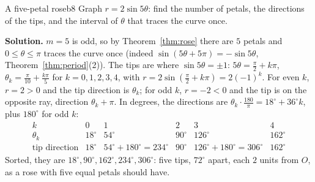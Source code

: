 \documentclass[11pt]{article}
\begin{document}
\begin{center}
\end{center}

\begin{exmp}{A five-petal rose}{b8}
Graph $r=2\sin5\theta$: find the number of petals, the directions of the tips, and the interval of $\theta$ that traces the curve once.

\textbf{Solution.} $m=5$ is odd, so by Theorem~\ref{thm:rose} there are $5$ petals and $0\le\theta\le\pi$ traces the curve once (indeed $\sin(5\theta+5\pi)=-\sin5\theta$, Theorem~\ref{thm:period}(2)). The tips are where $\sin5\theta=\pm1$: $5\theta=\frac\pi2+k\pi$, $\theta_k=\frac\pi{10}+\frac{k\pi}5$ for $k=0,1,2,3,4$, with $r=2\sin\left(\frac\pi2+k\pi\right)=2(-1)^k$. For even $k$, $r=2>0$ and the tip direction is $\theta_k$; for odd $k$, $r=-2<0$ and the tip is on the opposite ray, direction $\theta_k+\pi$. In degrees, the directions are $\theta_k\cdot\frac{180}\pi=18^\circ+36^\circ k$, plus $180^\circ$ for odd $k$:
\[
\begin{array}{c|ccccc}
k&0&1&2&3&4\\\hline
\theta_k&18^\circ&54^\circ&90^\circ&126^\circ&162^\circ\\
\text{tip direction}&18^\circ&54^\circ+180^\circ=234^\circ&90^\circ&126^\circ+180^\circ=306^\circ&162^\circ
\end{array}
\]
Sorted, they are $18^\circ,90^\circ,162^\circ,234^\circ,306^\circ$: five tips, $72^\circ$ apart, each $2$ units from $O$, as a rose with five equal petals should have.
\end{exmp}
\end{document}
